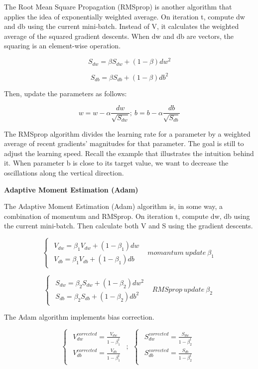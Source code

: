 \documentclass[12pt,]{krantz}
\begin{document}
The Root Mean Square Propagation (RMSprop) is another algorithm that applies the idea of exponentially weighted average. On iteration t, compute dw and db using the current mini-batch. Instead of V, it calculates the weighted average of the squared gradient descents. When dw and db are vectors, the squaring is an element-wise operation.

\[S_{dw}=\beta S_{dw} + (1-\beta)dw^2\]

\[S_{db}=\beta S_{db} + (1-\beta)db^2\]

Then, update the parameters as follows:

\[w = w - \alpha \frac{dw}{\sqrt{S_{dw}}};\ b=b-\alpha \frac{db}{\sqrt{S_{db}}}\]

The RMSprop algorithm divides the learning rate for a parameter by a weighted average of recent gradients' magnitudes for that parameter. The goal is still to adjust the learning speed. Recall the example that illustrates the intuition behind it. When parameter b is close to its target value, we want to decrease the oscillations along the vertical direction.

\textbf{Adaptive Moment Estimation (Adam)}

The Adaptive Moment Estimation (Adam) algorithm is, in some way, a combination of momentum and RMSprop. On iteration t, compute dw, db using the current mini-batch. Then calculate both V and S using the gradient descents.

\[\begin{cases} \begin{array}{c} V_{dw}=\beta_{1}V_{dw}+(1-\beta_{1})dw\\ V_{db}=\beta_{1}V_{db}+(1-\beta_{1})db \end{array} & momantum\ update\ \beta_{1}\end{cases}\]

\[\begin{cases} \begin{array}{c} S_{dw}=\beta_{2}S_{dw}+(1-\beta_{2})dw^{2}\\ S_{db}=\beta_{2}S_{db}+(1-\beta_{2})db^{2} \end{array} & RMSprop\ update\ \beta_{2}\end{cases}\]

The Adam algorithm implements bias correction.

\[\begin{cases} \begin{array}{c} V_{dw}^{corrected}=\frac{V_{dw}}{1-\beta_{1}^{t}}\\ V_{db}^{corrected}=\frac{V_{db}}{1-\beta_{1}^{t}} \end{array}\end{cases};\ \ \begin{cases} \begin{array}{c} S_{dw}^{corrected}=\frac{S_{dw}}{1-\beta_{2}^{t}}\\ S_{db}^{corrected}=\frac{S_{db}}{1-\beta_{2}^{t}} \end{array}\end{cases}\]
\end{document}
